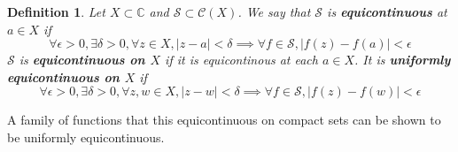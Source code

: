 \documentclass{article}
\newcommand{\mbb}[1]{\mathbb{#1}}
\newcommand{\mc}[1]{\mathcal{#1}}
\newtheorem{definition}{Definition}
\begin{document}
\begin{definition}
Let \(X \subset \mbb{C}\) and \(\mc{S} \subset \mc{C}(X)\). We say that \(\mc{S}\) is \textbf{equicontinuous} at \(a \in X\) if
\begin{equation}\forall \epsilon > 0, \exists \delta > 0, \forall z \in X, |z - a| < \delta \implies \forall f \in \mc{S}, |f(z) - f(a)| < \epsilon\end{equation}
\(\mc{S}\) is \textbf{equicontinuous on \(X\)} if it is equicontinous at each \(a \in X\). It is \textbf{uniformly equicontinuous on \(X\)} if
\begin{equation}\forall \epsilon > 0, \exists \delta > 0, \forall z, w \in X, |z - w| <\delta \implies \forall f \in \mc{S}, |f(z) - f(w)| < \epsilon\end{equation}
\end{definition}
A family of functions that this equicontinuous on compact sets can be shown to be uniformly equicontinuous.
\end{document}
